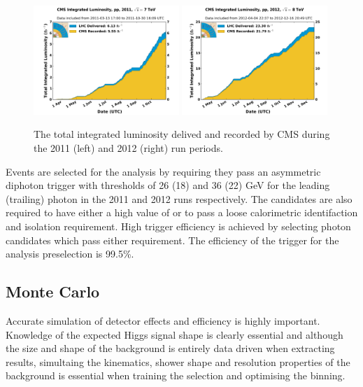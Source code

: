 \begin{figure}
  \includegraphics[width=0.49\textwidth]{ch3_comm_anal_comps/plots/int_lumi_2011.pdf}
  \includegraphics[width=0.49\textwidth]{ch3_comm_anal_comps/plots/int_lumi_2012.pdf}
  \caption{The total integrated luminosity delived and recorded by CMS during the 2011 (left) and 2012 (right) run periods.}
  \label{fig:intlumi}
\end{figure}

Events are selected for the analysis by requiring they pass an asymmetric diphoton trigger with \ET thresholds of 26 (18) and 36 (22) GeV for the leading (trailing) photon in the 2011 and 2012 runs respectively. The candidates are also required to have either a high value of \rnine or to pass a loose calorimetric identifaction and isolation requirement. High trigger efficiency is achieved by selecting photon candidates which pass either requirement. The efficiency of the trigger for the analysis preselection is 99.5\%.

\subsection{Monte Carlo}
\label{sec:mc}

Accurate simulation of detector effects and efficiency is highly important. Knowledge of the expected Higgs signal shape is clearly essential and although the size and shape of the \mgg background is entirely data driven when extracting results, simultaing the kinematics, shower shape and resolution properties of the background is essential when training the selection and optimising the binning. 

